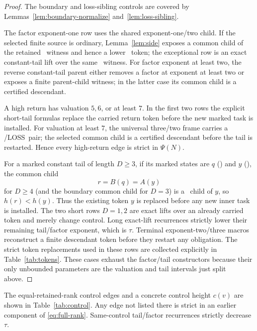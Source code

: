 \begin{proof}
The boundary and loss-sibling controls are covered by Lemmas~\ref{lem:boundary-normalize} and~\ref{lem:loss-sibling}.

The factor exponent-one row uses the shared exponent-one/two child. If the
selected finite source is ordinary, Lemma~\ref{lem:side} exposes a common
child of the retained \LOSS\ witness and hence a lower \WIN\ token; the
exceptional row is an exact constant-tail lift over the same \LOSS\ witness.
For factor exponent at least two, the reverse constant-tail parent either
removes a factor at exponent at least two or exposes a finite parent-child
witness; in the latter case its common child is a certified descendant.

A high return has valuation $5,6$, or at least $7$. In the first two rows the
explicit short-tail formulas replace the carried return token before the new
marked task is installed. For valuation at least $7$, the universal
three/two frame carries a \WIN/LOSS\ pair; the selected common child is a
certified descendant before the tail is restarted. Hence every high-return
edge is strict in $\Psi(N)$.

For a marked constant tail of length $D\ge3$, if its marked states are
$q$ (\WIN) and $y$ (\LOSS), the common child
\[
  r=B(q)=A(y)
\]
for $D\ge4$ (and the boundary common child for $D=3$) is a \WIN\ child of
$y$, so $h(r)<h(y)$. Thus the existing token $y$ is replaced before any new
inner task is installed. The two short rows $D=1,2$ are exact lifts over an
already carried token and merely change control. Long exact-lift recurrences
strictly lower their remaining tail/factor exponent, which is $\tau$.
Terminal exponent-two/three macros reconstruct a finite descendant token
before they restart any obligation. The strict token replacements used in these rows are collected explicitly in Table~\ref{tab:tokens}. These cases exhaust the factor/tail constructors because their only unbounded parameters are the valuation and tail intervals just split above.
\end{proof}

The equal-retained-rank control edges and a concrete control height $c(v)$ are
shown in Table~\ref{tab:control}. Any edge not listed there is strict in an
earlier component of \eqref{eq:full-rank}. Same-control tail/factor recurrences
strictly decrease $\tau$.

